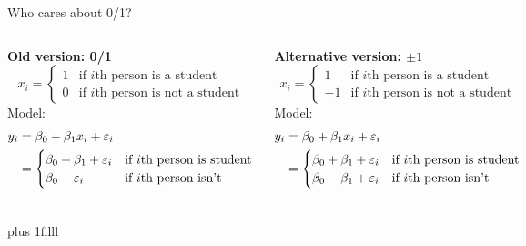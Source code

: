 \documentclass[aspectratio=169,usenames,dvipsnames]{beamer}
\newcommand{\InstructorNotes}[1]{\textit{\color{orange}#1}}
\renewcommand{\InstructorNotes}[1]{}
\newcommand{\bvfill}{\vskip0pt plus 1filll}
\begin{document}
\begin{frame}[t]{Who cares about 0/1?}

\begin{columns}
	\textbf{Old version: 0/1}
\begin{equation*}
		x_i =
	\begin{cases}
		1 & \text{if $i$th person is a student}\\
		0 & \text{if $i$th person is not a student}
	\end{cases}
\end{equation*}
Model:
\begin{align*}
y_i &= \beta_0 + \beta_1x_i+\varepsilon_i\\
&= 
	\begin{cases}
		\beta_0 + \beta_1+\varepsilon_i	 & \text{if $i$th person is student}\\
		\beta_0 +\varepsilon_i & \text{if $i$th person isn't}
	\end{cases}
\end{align*}

\textbf{Alternative version: $\pm 1$}
\begin{equation*}
		x_i =
	\begin{cases}
		1 & \text{if $i$th person is a student}\\
		-1 & \text{if $i$th person is not a student}
	\end{cases}
\end{equation*}
Model:
\begin{align*}
y_i &= \beta_0 + \beta_1x_i+\varepsilon_i\\
&= 
	\begin{cases}
		\beta_0 + \beta_1+\varepsilon_i	 & \text{if $i$th person is student}\\
		\beta_0 - \beta_1+\varepsilon_i & \text{if $i$th person isn't}
	\end{cases}
\end{align*}

\end{columns}

\bvfill
\InstructorNotes{Note that the predictions will be the same}
\end{frame}
\end{document}
